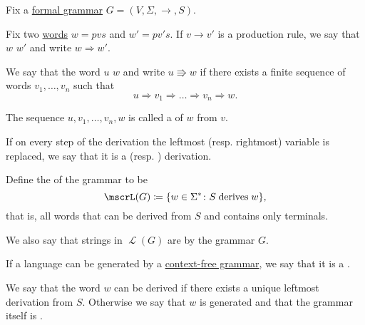 \begin{definition}\label{def:grammar_derivation}
  Fix a \hyperref[def:grammar]{formal grammar} \( G = (V, \Sigma, \to, S) \).

  \begin{thmenum}
     Fix two \hyperref[def:language/word]{words} \( w = pvs \) and \( w' = pv's \). If \( v \to v' \) is a production rule, we say that \( w \)  \( w' \) and write \( w \Rightarrow w' \).

     We say that the word \( u \)  \( w \) and write \( u \Rrightarrow w \) if there exists a finite sequence of words \( v_1, \ldots, v_n \) such that
    \begin{equation*}
      u \Rightarrow v_1 \Rightarrow \ldots \Rightarrow v_n \Rightarrow w.
    \end{equation*}

    The sequence \( u, v_1, \ldots, v_n, w \) is called a  of \( w \) from \( v \).

     If on every step of the derivation the leftmost (resp. rightmost) variable is replaced, we say that it is a  (resp. ) derivation.

     Define the  of the grammar to be
    \begin{equation*}
      \mscrL(G) \coloneqq \{ w \in \Sigma^* \colon S \T{derives} w \},
    \end{equation*}
    that is, all words that can be derived from \( S \) and contains only terminals.

    We also say that strings in \( \mscrL(G) \) are  by the grammar \( G \).

    If a language can be generated by a \hyperref[def:grammar/context_free]{context-free grammar}, we say that it is a .

    We say that the word \( w \) can be derived  if there exists a unique leftmost derivation from \( S \). Otherwise we say that \( w \) is generated  and that the grammar itself is .
  \end{thmenum}
\end{definition}

